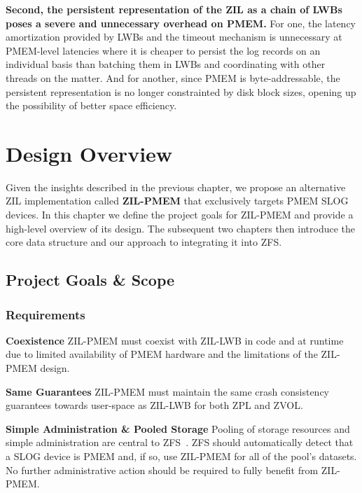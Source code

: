 \documentclass[12pt,a4paper,twoside]{book}
\begin{document}
\textbf{Second, the persistent representation of the ZIL as a chain of LWBs poses a severe and unnecessary overhead on PMEM.}
For one, the latency amortization provided by LWBs and the timeout mechanism is unnecessary at PMEM-level latencies where it is cheaper to persist the log records on an individual basis than batching them in LWBs and coordinating with other threads on the matter.
And for another, since PMEM is byte-addressable, the persistent representation is no longer constrainted by disk block sizes, opening up the possibility of better space efficiency.

\chapter{Design Overview}\label{ch:designoverview}
Given the insights described in the previous chapter, we propose an alternative ZIL implementation called \textbf{ZIL-PMEM} that exclusively targets PMEM SLOG devices.
In this chapter we define the project goals for ZIL-PMEM and provide a high-level overview of its design.
The subsequent two chapters then introduce the core data structure and our approach to integrating it into ZFS.

\section{Project Goals \& Scope}

\newcommand{\csgoal}[1]{\textbf{#1}}

\subsection{Requirements}\label{sec:requirements}

\csgoal{Coexistence}
ZIL-PMEM must coexist with ZIL-LWB in code and at runtime due to limited availability of PMEM hardware and the limitations of the ZIL-PMEM design.

\csgoal{Same Guarantees}
ZIL-PMEM must maintain the same crash consistency guarantees towards user-space as ZIL-LWB for both ZPL and ZVOL.

\csgoal{Simple Administration \& Pooled Storage}
Pooling of storage resources and simple administration are central to ZFS~\cite{bonwickZettabyteFileSystem2003}.
ZFS should automatically detect that a SLOG device is PMEM and, if so, use ZIL-PMEM for all of the pool’s datasets.
No further administrative action should be required to fully benefit from ZIL-PMEM.
\end{document}
